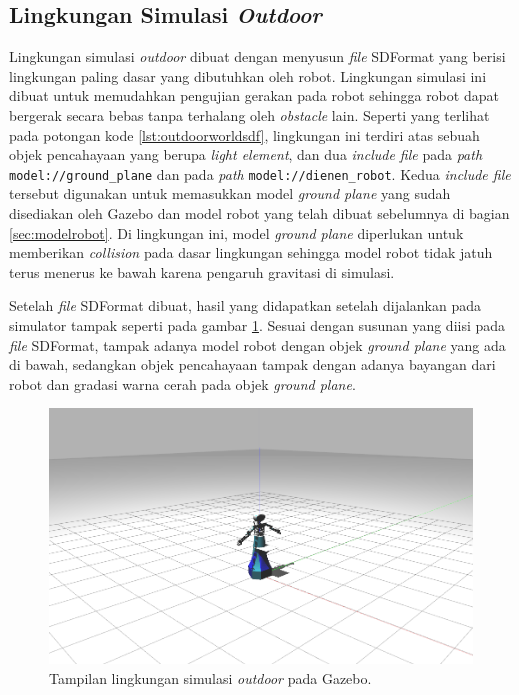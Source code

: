 \subsection{Lingkungan Simulasi \emph{Outdoor}}
\label{subsec:lingkunganoutdoor}

Lingkungan simulasi \emph{outdoor} dibuat dengan menyusun \emph{file} SDFormat yang berisi lingkungan paling dasar yang dibutuhkan oleh robot.
Lingkungan simulasi ini dibuat untuk memudahkan pengujian gerakan pada robot sehingga robot dapat bergerak secara bebas tanpa terhalang oleh \emph{obstacle} lain.
Seperti yang terlihat pada potongan kode \ref{lst:outdoorworldsdf},
  lingkungan ini terdiri atas sebuah objek pencahayaan yang berupa \emph{light element},
  dan dua \emph{include file} pada \emph{path} \lstinline{model://ground_plane} dan pada \emph{path} \lstinline{model://dienen_robot}.
Kedua \emph{include file} tersebut digunakan untuk memasukkan model \emph{ground plane} yang sudah disediakan oleh Gazebo dan model robot yang telah dibuat sebelumnya di bagian \ref{sec:modelrobot}.
Di lingkungan ini, model \emph{ground plane} diperlukan untuk memberikan \emph{collision} pada dasar lingkungan sehingga model robot tidak jatuh terus menerus ke bawah karena pengaruh gravitasi di simulasi.



Setelah \emph{file} SDFormat dibuat,
  hasil yang didapatkan setelah dijalankan pada simulator tampak seperti pada gambar \ref{fig:lingkunganoutdoor}.
Sesuai dengan susunan yang diisi pada \emph{file} SDFormat,
  tampak adanya model robot dengan objek \emph{ground plane} yang ada di bawah,
  sedangkan objek pencahayaan tampak dengan adanya bayangan dari robot dan gradasi warna cerah pada objek \emph{ground plane}.

\begin{figure}[ht]
  \centering
  \includegraphics[scale=0.23]{gambar/lingkungan-outdoor.png}
  \caption{Tampilan lingkungan simulasi \emph{outdoor} pada Gazebo.}
  \label{fig:lingkunganoutdoor}
\end{figure}
